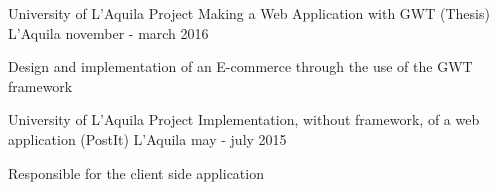 \begin{cventries}
\cventry
{University of L'Aquila Project} %
{Making a Web Application with GWT (Thesis)} %
{L'Aquila} %
{november - march 2016} %
{ %
	\begin{cvitems}
		\item {Design and implementation of an E-commerce through the use of the GWT framework}
	\end{cvitems}
}

\cventry
{University of L'Aquila Project} %
{Implementation, without framework, of a web application (PostIt)} %
{L'Aquila} %
{may - july 2015} %
{ %
	\begin{cvitems}
		\item {Responsible for the client side application}
	\end{cvitems}
}

\end{cventries}